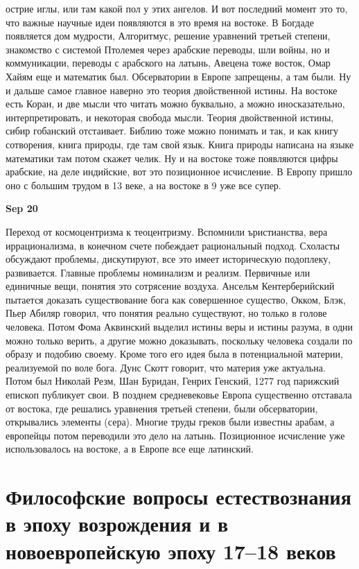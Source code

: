 \documentclass[a4paper, 12pt]{article}
\begin{document}
острие иглы, или там какой пол у этих ангелов. И вот последний момент 
это то, что важные научные идеи появляются в это время на востоке. 
В Богдаде появляется дом мудрости, Алгоритмус, решение уравнений третьей 
степени, знакомство с системой Птолемея через арабские переводы, шли 
войны, но и коммуникации, переводы с арабского на латынь, Авецена тоже 
восток, Омар Хайям еще и математик был. Обсерватории в Европе запрещены, 
а там были. Ну и дальше самое главное наверно это теория двойственной 
истины. На востоке есть Коран, и две мысли что читать можно буквально, 
а можно иносказательно, интерпретировать, и некоторая свобода мысли. 
Теория двойственной истины, сибир гобанский отстаивает. Библию тоже 
можно понимать и так, и как книгу сотворения, книга природы, где там 
свой язык. Книга природы написана на языке математики там потом скажет 
челик. Ну и на востоке тоже появляются цифры арабские, на деле 
индийские, вот это позиционное исчисление. В Европу пришло оно с большим 
трудом в 13 веке, а на востоке в 9 уже все супер.

\hfill \textbf{Sep 20}

Переход от космоцентризма к теоцентризму. Вспомнили ъристианства, вера 
иррационализма, в конечном счете побеждает рациональный подход. Схоласты 
обсуждают проблемы, дискутируют, все это имеет историческую подоплеку, 
развивается. Главные проблемы номинализм и реализм. Первичные или 
единичные вещи, понятия это сотрясение воздуха. Ансельм Кентерберийский 
пытается доказать существование бога как совершенное существо, Окком, 
Блэк, Пьер Абиляр говорил, что понятия реально существуют, но только 
в голове человека. Потом Фома Аквинский выделил истины веры и истины 
разума, в одни можно только верить, а другие можно доказывать, поскольку 
человека создали по образу и подобию своему. Кроме того его идея была 
в потенциальной материи, реализуемой по воле бога. Дунс Скотт говорит, 
что материя уже актуальна. Потом был Николай Резм, Шан Буридан, Генрих 
Генский, 1277 год парижский епископ публикует свои. В позднем 
средневековье Европа существенно отставала от востока, где решались 
уравнения третьей степени, были обсерватории, открывались элементы 
(сера). Многие труды греков были известны арабам, а европейцы потом 
переводили это дело на латынь. Позиционное исчисление уже использовалось 
на востоке, а в Европе все еще латинский.


\section{Философские вопросы естествознания в эпоху возрождения и в новоевропейскую эпоху 17--18 веков}
\end{document}
